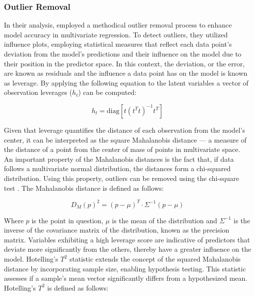 \subsubsection{Outlier Removal}\label{sec:outlier_removal}

In their analysis, \citet{andersonImprovedAccuracyQuantitative2017} employed a methodical outlier removal process to enhance model accuracy in multivariate regression. To detect outliers, they utilized influence plots, employing statistical measures that reflect each data point's deviation from the model's predictions and their influence on the model due to their position in the predictor space. 
In this context, the deviation, or the error, are known as residuals and the influence a data point has on the model is known as leverage. By applying the following equation to the latent variables a vector of observation leverages (\(h_t\)) can be computed:

\begin{equation}
    h_t = \text{diag}\left[ t(t^T t)^{-1} t^T \right]
\end{equation}

Given that leverage quantifies the distance of each observation from the model's center, it can be interpreted as the square Mahalanobis distance — a measure of the distance of a point from the center of mass of points in multivariate space. 
An important property of the Mahalanobis distances is the fact that, if data follows a multivariate normal distribution, the distances form a chi-squared distribution. Using this property, outliers can be removed using the chi-square test \cite{brereton_chi_2015}.
The Mahalanobis distance is defined as follows:

\begin{equation}
    D_M(p)^2 = (p - \mu)^T \cdot \Sigma^{-1} (p - \mu)
\end{equation}

Where $p$ is the point in question, $\mu$ is the mean of the distribution and $\Sigma^{-1}$ is the inverse of the covariance matrix of the distribution, known as the precision matrix. 
Variables exhibiting a high leverage score are indicative of predictors that deviate more significantly from the others, thereby have a greater influence on the model.
Hotelling's \( T^2 \) statistic extends the concept of the squared Mahalanobis distance by incorporating sample size, enabling hypothesis testing. 
This statistic assesses if a sample's mean vector significantly differs from a hypothesized mean. Hotelling's \( T^2 \) is defined as follows:

